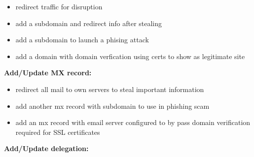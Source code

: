 \begin{itemize}
\item redirect traffic for disruption
\item add a subdomain and redirect info after stealing 
\item add a subdomain to launch a phising attack 
\item add a domain with domain verfication using certs to show as legitimate site 
\end{itemize}
\textbf{Add/Update MX record:} 
\begin{itemize}
\item redirect all mail to own servers to steal important information 
\item add another mx record with subdomain to use in phishing scam 
\item add an mx record with email server configured to by pass domain verification required for SSL certificates

\end{itemize}

\textbf{Add/Update delegation:}

